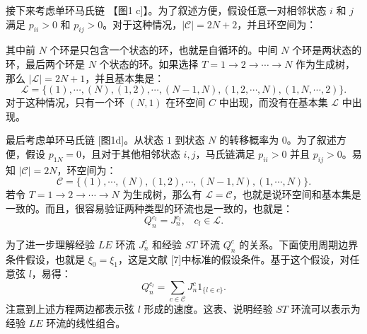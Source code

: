 接下来考虑单环马氏链 【图1 c]】。为了叙述方便，假设任意一对相邻状态 $i$ 和 $j$ 满足 $p_{ii}>0$ 和 $p_{ij}>0$。对于这种情况，$|\mathcal{C}| = 2N +2$，并且环空间为：

其中前 $N$ 个环是只包含一个状态的环，也就是自循环的。中间 $N$ 个环是两状态的环，最后两个环是 $N$ 个状态的环。如果选择 $T = 1\to 2\to\cdots \to N$ 作为生成树，那么 $|\mathcal{L}| = 2N + 1$，并且基本集是：
\begin{equation*}
    \mathcal{L} = \{(1),\cdots,(N),(1,2),\cdots,(N-1,N),(1,2,\cdots,N),(1,N,\cdots,2)\}.
\end{equation*}
对于这种情况，只有一个环 $(N, 1)$ 在环空间 $C$ 中出现，而没有在基本集 $\mathcal{L}$ 中出现。

最后考虑单环马氏链 [图1d]。从状态 $1$ 到状态 $N$ 的转移概率为 $0$。为了叙述方便，假设 $p_{1N}=0$，且对于其他相邻状态 $i,j$，马氏链满足 $p_{ii}>0$ 并且 $p_{ij}>0$。易知 $|\mathcal{C}|=2N$，环空间为：
\begin{equation*}
    \mathcal{C} = \{(1),\cdots,(N),(1,2),\cdots,(N-1,N),(1,\cdots,N)\}.
\end{equation*}
若令 $T = 1\to 2\to\cdots \to N$ 为生成树，那么有 $\mathcal{L} = \mathcal{C}$，也就是说环空间和基本集是一致的。而且，很容易验证两种类型的环流也是一致的，也就是：
\begin{equation}\label{same cycle current}
    Q_n^{c_l} = J^{c_l}_n,\;\;\;c_l\in \mathcal{L}.
\end{equation}

为了进一步理解经验 $LE$ 环流 $J_n^c$ 和经验 $ST$ 环流 $Q_n^c$ 的关系。下面使用周期边界条件假设，也就是 $\xi_0 = \xi_1$，这是文献 [7]中标准的假设条件。基于这个假设，对任意弦 $l$，易得：
\begin{equation}\label{conversion}
    Q_n^{c_l} = \sum_{c\in\mathcal{C}}J^c_n1_{\{l\in c\}}.
\end{equation}
注意到上述方程两边都表示弦 $l$ 形成的速度。这表、说明经验 $ST$ 环流可以表示为经验 $LE$ 环流的线性组合。